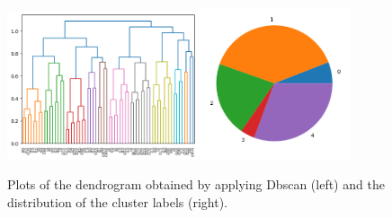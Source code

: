 \documentclass[10pt,a4paper]{report}
\begin{document}
\begin{figure}[h]
	\centering
	\includegraphics[width=0.5\textwidth]{hiera_dendro}\includegraphics[width=0.4\textwidth]{hiera_distribution}
	\caption{Plots of the dendrogram obtained by applying Dbscan (left) and the distribution of the cluster labels (right).}
	\label{hiera}
\end{figure}
\end{document}
